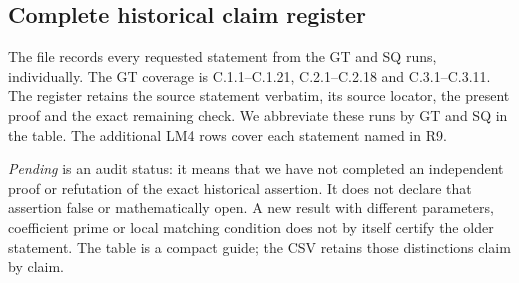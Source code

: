 \subsection{Complete historical claim register}

The file  records every requested
statement from the GT and SQ runs, individually. The GT coverage is
C.1.1--C.1.21, C.2.1--C.2.18 and C.3.1--C.3.11.
The register retains the source statement verbatim, its source
locator, the present proof and the exact remaining check. We abbreviate
these runs by GT and SQ in the table. The additional LM4 rows cover each
statement named in R9.

\emph{Pending} is an audit status: it means that we have not completed
an independent proof or refutation of the exact historical assertion.
It does not declare that assertion false or mathematically open.
A new result with different parameters, coefficient prime or local
matching condition does not by itself certify the older statement.
The table is a compact guide; the CSV retains those distinctions
claim by claim.


